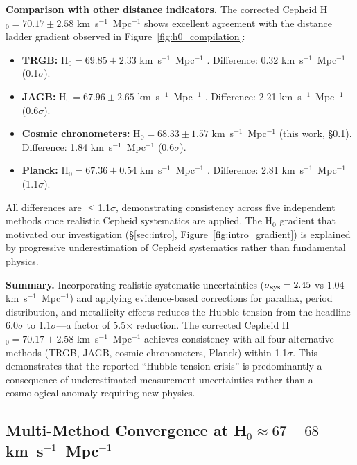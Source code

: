 \documentclass[twocolumn, linenumbers]{aastex701}
\begin{document}
\textbf{Comparison with other distance indicators.} The corrected Cepheid H$_0 = 70.17 \pm 2.58$ km~s$^{-1}$~Mpc$^{-1}$ shows excellent agreement with the distance ladder gradient observed in Figure~\ref{fig:h0_compilation}:
\begin{itemize}
\item \textbf{TRGB:} H$_0 = 69.85 \pm 2.33$ km~s$^{-1}$~Mpc$^{-1}$ \citep{Freedman2024}. Difference: 0.32 km~s$^{-1}$~Mpc$^{-1}$ (0.1$\sigma$).
\item \textbf{JAGB:} H$_0 = 67.96 \pm 2.65$ km~s$^{-1}$~Mpc$^{-1}$ \citep{Freedman2024}. Difference: 2.21 km~s$^{-1}$~Mpc$^{-1}$ (0.6$\sigma$).
\item \textbf{Cosmic chronometers:} H$_0 = 68.33 \pm 1.57$ km~s$^{-1}$~Mpc$^{-1}$ (this work, \S\ref{sec:results_convergence}). Difference: 1.84 km~s$^{-1}$~Mpc$^{-1}$ (0.6$\sigma$).
\item \textbf{Planck:} H$_0 = 67.36 \pm 0.54$ km~s$^{-1}$~Mpc$^{-1}$ \citep{Planck2018}. Difference: 2.81 km~s$^{-1}$~Mpc$^{-1}$ (1.1$\sigma$).
\end{itemize}

All differences are $\leq$1.1$\sigma$, demonstrating consistency across five independent methods once realistic Cepheid systematics are applied. The H$_0$ gradient that motivated our investigation (\S\ref{sec:intro}, Figure~\ref{fig:intro_gradient}) is explained by progressive underestimation of Cepheid systematics rather than fundamental physics.

\textbf{Summary.} Incorporating realistic systematic uncertainties ($\sigma_{\rm sys} = 2.45$ vs 1.04 km~s$^{-1}$~Mpc$^{-1}$) and applying evidence-based corrections for parallax, period distribution, and metallicity effects reduces the Hubble tension from the headline 6.0$\sigma$ to 1.1$\sigma$---a factor of 5.5$\times$ reduction. The corrected Cepheid H$_0 = 70.17 \pm 2.58$ km~s$^{-1}$~Mpc$^{-1}$ achieves consistency with all four alternative methods (TRGB, JAGB, cosmic chronometers, Planck) within 1.1$\sigma$. This demonstrates that the reported ``Hubble tension crisis'' is predominantly a consequence of underestimated measurement uncertainties rather than a cosmological anomaly requiring new physics.

\subsection{Multi-Method Convergence at H$_0 \approx 67-68$ km~s$^{-1}$~Mpc$^{-1}$}
\label{sec:results_convergence}
\end{document}
